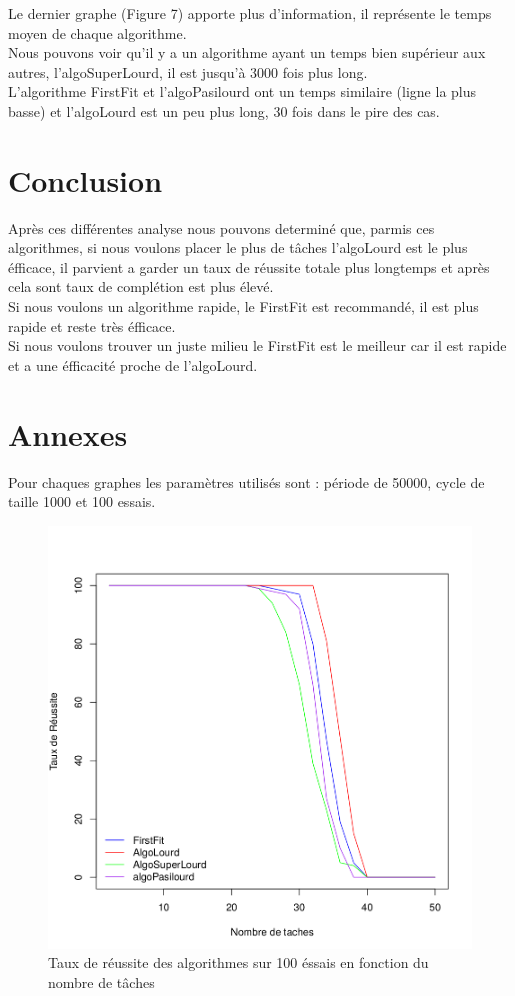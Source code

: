 \documentclass[11pt]{article}
\begin{document}
Le dernier graphe (Figure 7) apporte plus d'information, il représente le temps moyen de chaque algorithme.\\
Nous pouvons voir qu'il y a un algorithme ayant un temps bien supérieur aux autres, l'algoSuperLourd, il est jusqu'à 3000 fois plus long.\\
L'algorithme FirstFit et l'algoPasilourd ont un temps similaire (ligne la plus basse) et l'algoLourd est un peu plus long, 30 fois dans le pire des cas.\\



\section{Conclusion}

Après ces différentes analyse nous pouvons determiné que, parmis ces algorithmes, si nous voulons placer le plus de tâches l'algoLourd est le plus éfficace, il parvient a garder un taux de réussite totale plus longtemps et après cela sont taux de complétion est plus élevé.\\
Si nous voulons un algorithme rapide, le FirstFit est recommandé, il est plus rapide et reste très éfficace. \\
Si nous voulons trouver un juste milieu le FirstFit est le meilleur car il est rapide et a une éfficacité proche de l'algoLourd.\\

\newpage
\section{Annexes}

Pour chaques graphes les paramètres utilisés sont : période de 50000, cycle de taille 1000 et 100 essais.
\begin{figure}[!ht]
    \center
    \includegraphics[scale = 0.4]{taux_reussite}
    \caption{Taux de réussite des algorithmes sur 100 éssais en fonction du nombre de tâches}
\end{figure} 
\end{document}
